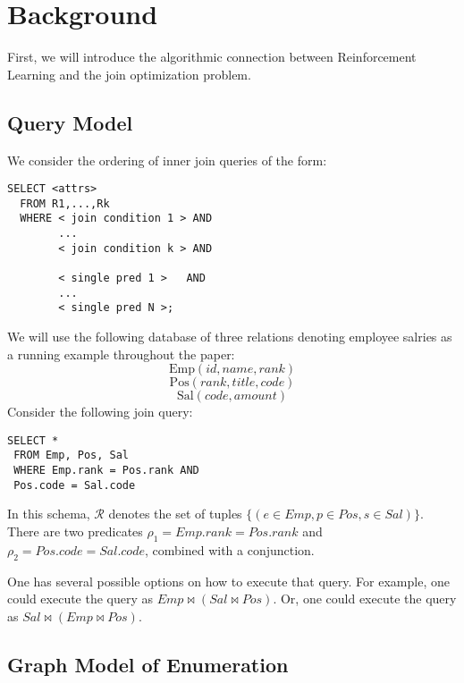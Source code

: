 \section{Background}
First, we will introduce the algorithmic connection between Reinforcement Learning and the join optimization problem.

\subsection{Query Model}
\noindent We consider the ordering of inner join queries of the form:
\begin{lstlisting}
SELECT <attrs>
  FROM R1,...,Rk
  WHERE < join condition 1 > AND
        ...
        < join condition k > AND
       
        < single pred 1 >   AND
        ...
        < single pred N >;
\end{lstlisting}
We will use the following database of three relations denoting employee salries as a running example throughout the paper:
\[
\text{Emp}(id, name, rank)
\]
\[
\text{Pos}(rank, title, code)
\]
\[
\text{Sal}(code, amount)
\]
Consider the following join query:
\begin{lstlisting}
SELECT *
 FROM Emp, Pos, Sal
 WHERE Emp.rank = Pos.rank AND
 Pos.code = Sal.code
\end{lstlisting}
In this schema, $\mathcal{R}$ denotes the set of tuples $\{(e \in Emp, p \in Pos, s \in Sal)\}$.  There are two predicates $\rho_1 = Emp.rank = Pos.rank$ and $\rho_2 = Pos.code = Sal.code$, combined with a conjunction. 

One has several possible options on how to execute that query. For example, one could execute the query as $Emp \bowtie (Sal \bowtie Pos)$. Or, one could execute the query as $Sal \bowtie (Emp \bowtie Pos)$. 



\subsection{Graph Model of Enumeration}

